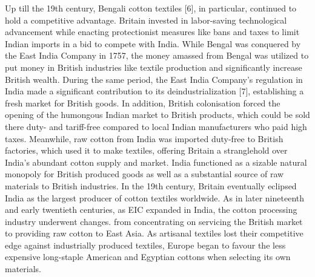 \documentclass[conference]{IEEEtran}
\begin{document}
Up till the 19th century, Bengali cotton textiles [6], in particular, continued to hold a competitive advantage. Britain invested in labor-saving technological advancement while enacting protectionist measures like bans and taxes to limit Indian imports in a bid to compete with India. While Bengal was conquered by the East India Company in 1757, the money amassed from Bengal was utilized to put money in British industries like textile production and significantly increase British wealth. During the same period, the East India Company's regulation in India made a significant contribution to its deindustrialization [7], establishing a fresh market for British goods. In addition, British colonisation forced the opening of the humongous Indian market to British products, which could be sold there duty- and tariff-free compared to local Indian manufacturers who paid high taxes. Meanwhile, raw cotton from India was imported duty-free to British factories, which used it to make textiles, offering Britain a stranglehold over India's abundant cotton supply and market. India functioned as a sizable natural monopoly for British produced goods as well as a substantial source of raw materials to British industries. In the 19th century, Britain eventually eclipsed India as the largest producer of cotton textiles worldwide. As in later nineteenth and early twentieth centuries, as EIC expanded in India, the cotton processing industry underwent changes. from concentrating on servicing the British market to providing raw cotton to East Asia. As artisanal textiles lost their competitive edge against industrially produced textiles, Europe began to favour the less expensive long-staple American and Egyptian cottons when selecting its own materials. \\
\end{document}

